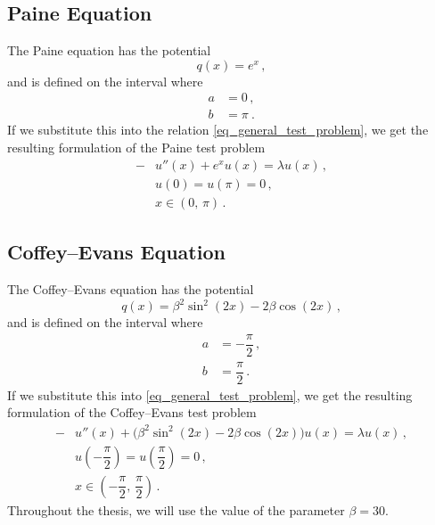 \documentclass[11pt,a4paper,oneside,openright]{report} %
\begin{document}
\subsection{Paine Equation}
\noindent
The Paine equation has the potential
\begin{equation}
    q(x) = e^x \, ,
\end{equation}
and is defined on the interval where
\begin{equation}
    \begin{split}
        a & = 0 \, , \\[2pt]
        b & = \pi \ .
    \end{split}
\end{equation}
If we substitute this into the relation \eqref{eq_general_test_problem}, we get the resulting formulation of the Paine test problem
\begin{subequations}\label{eq_SL}
    \begin{align}
    - & u''(x) + e^x u(x) = \lambda u(x) \, , \\[5pt]
    & u(0) = u(\pi) = 0 \, , \\[5pt]
    & x \in (0,  \, \pi) \, .
    \end{align}
\end{subequations}


\subsection{Coffey--Evans Equation}
\noindent 
The Coffey--Evans equation has the potential
\begin{equation}
    q(x) = \beta^2 \sin^2{(2 x)} - 2 \beta \cos{(2 x)} \, ,
\end{equation}
and is defined on the interval where
\begin{equation}\label{eq_CE_coeffs}
    \begin{split}
        a & = - \dfrac{\pi}{2} \, , \\[2pt]
        b & = \dfrac{\pi}{2} \, .
    \end{split}
\end{equation}
If we substitute this into \eqref{eq_general_test_problem}, we get the resulting formulation of the Coffey--Evans test problem
\begin{subequations}\label{eq_CE}
    \begin{align}
    - & u''(x) + \big(\beta^2 \sin^2{(2 x)} - 2 \beta \cos{(2 x)} \big) u(x) = \lambda  u(x) \, , \\[5pt]
    & u\left(-\dfrac{\pi}{2}\right) = u\left(\dfrac{\pi}{2}\right) = 0 \, , \\[5pt]
    & x \in \left(-\dfrac{\pi}{2} ,  \, \dfrac{\pi}{2}\right) \, .
    \end{align}
\end{subequations}
Throughout the thesis, we will use the value of the parameter $\beta = 30$.
\end{document}
